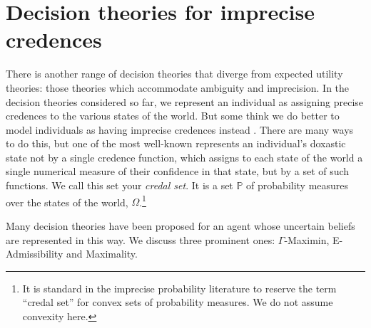 \documentclass[a4paper]{article}
\renewcommand\P{\mathbb{P}} %
\newcommand{\IP}{\P}
\newcommand{\todoinfo}[2][]{\todo[backgroundcolor=orange!80,bordercolor=black,linecolor=gray!80, #1,inline,caption={}]{#2}}
\newenvironment{CCM rewritten}
{\begingroup\color{blue}} %
{\endgroup}              %
\begin{document}






\section{Decision theories for imprecise credences}

There is another range of decision theories that diverge from expected utility theories: those theories which accommodate ambiguity and imprecision. In the decision theories considered so far, we represent an individual as assigning precise credences to the various states of the world. But some think we do better to model individuals as having imprecise credences instead \citep{walley1991srip, bradley2016ip}. There are many ways to do this, but one of the most well-known represents an individual's doxastic state not by a single credence function, which assigns to each state of the world a single numerical measure of their confidence in that state, but by a set of such functions. We call this set your \textit{credal set}. It is a set $\IP$ of probability measures over the states of the world, $\Omega$.\footnote{{It is standard in the imprecise probability literature to reserve the term ``credal set'' for convex sets of probability measures. We do not assume convexity here.}}


Many decision theories have been proposed for an agent whose uncertain beliefs are represented in this way. We discuss three prominent ones: $\Gamma$-Maximin, E-Admissibility and Maximality. %
\end{document}
